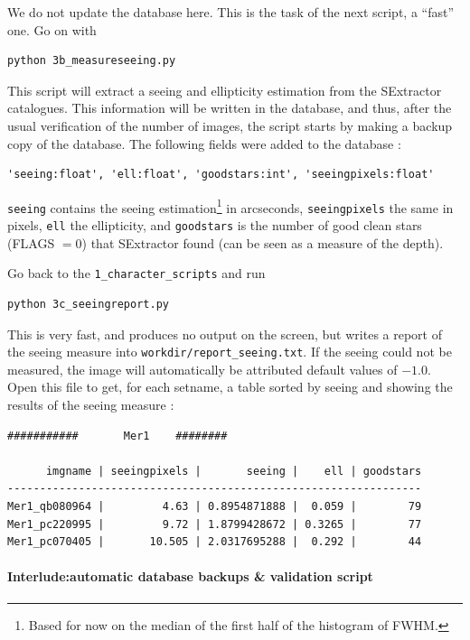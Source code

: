 We do not update the database here. This is the task of the next script, a ``fast'' one.
Go on with

\begin{Verbatim}
python 3b_measureseeing.py
\end{Verbatim}

This script will extract a seeing and ellipticity estimation from the SExtractor catalogues. This information will be written in the database, and thus, after the usual verification of the number of images, the script starts by making a backup copy of the database.
The following fields were added to the database :
\begin{Verbatim}
'seeing:float', 'ell:float', 'goodstars:int', 'seeingpixels:float'
\end{Verbatim}
\verb+seeing+ contains the seeing estimation\footnote{Based for now on the median of the first half of the histogram of FWHM.} in arcseconds, \verb+seeingpixels+ the same in pixels,  \verb+ell+ the ellipticity, and \verb+goodstars+ is the number of good clean stars (FLAGS $= 0$) that SExtractor found (can be seen as a measure of the depth).

Go back to the \verb+1_character_scripts+ and run
\begin{Verbatim}
python 3c_seeingreport.py 
\end{Verbatim}

This is very fast, and produces no output on the screen, but writes a report of the seeing measure into \verb+workdir/report_seeing.txt+. If the seeing could not be measured, the image will automatically be attributed default values of $-1.0$.
Open this file to get, for each setname, a table sorted by seeing and showing the results of the seeing measure :

\begin{Verbatim}[fontsize=\relsize{-2}]
      ###########       Mer1    ########

      imgname | seeingpixels |       seeing |    ell | goodstars
----------------------------------------------------------------
Mer1_qb080964 |         4.63 | 0.8954871888 |  0.059 |        79
Mer1_pc220995 |         9.72 | 1.8799428672 | 0.3265 |        77
Mer1_pc070405 |       10.505 | 2.0317695288 |  0.292 |        44
\end{Verbatim}


\paragraph{Interlude:automatic database backups \& validation script}

